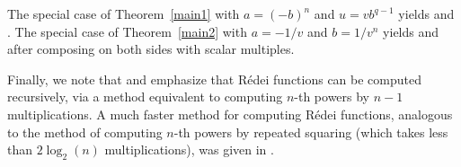 \documentclass[11pt]{amsart}
\numberwithin{equation}{section}
\theoremstyle{definition}
\begin{document}
The special case of Theorem~\ref{main1} with $a=(-b)^n$ and $u=vb^{q-1}$ yields \cite[Thm.~3.5]{WYDM} and \cite[Thm.~1.2]{ZR}.
The special case of Theorem~\ref{main2} with $a=-1/v$ and $b=1/v^n$ yields \cite[Thm.~3.3]{WYDM} and \cite[Thm.~1.1]{ZR} after composing on both sides with scalar multiples.  

Finally, we note that \cite{FFLW} and \cite{PUW} emphasize that R\'edei functions can be computed recursively, via a method equivalent to computing $n$-th powers by $n-1$ multiplications.  A much faster method for computing R\'edei functions, analogous to the method of computing $n$-th powers by repeated squaring (which takes less than $2\log_2(n)$ multiplications), was given in \cite{More}.

\end{document}
